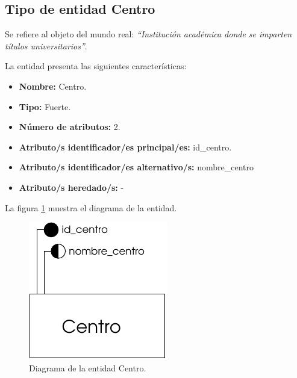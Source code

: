 \subsection{Tipo de entidad Centro}

   \begin{description}

   \item[Definición] Se refiere al objeto del mundo real: \emph{``Institución académica donde se imparten títulos universitarios''}.

   \item[Características] La entidad presenta las siguientes características:
      \begin{itemize}
         \item \textbf{Nombre:} Centro.
         \item \textbf{Tipo:} Fuerte.
         \item \textbf{Número de atributos:} 2.
         \item \textbf{Atributo/s identificador/es principal/es:} id\_centro.
         \item \textbf{Atributo/s identificador/es alternativo/s:} nombre\_centro
         \item \textbf{Atributo/s heredado/s:} -
      \end{itemize}

   \item[Diagrama] La figura \ref{diagramaCentro} muestra el diagrama de la entidad.
   \item \begin{figure}[!ht]
            \begin{center}
            \includegraphics[]{07.Modelo_Entidad-Interrelacion/7.2.Analisis_Entidades/diagramas/centro.pdf}
            \caption{Diagrama de la entidad Centro.}
            \label{diagramaCentro}
            \end{center}
         \end{figure}


\end{description}
